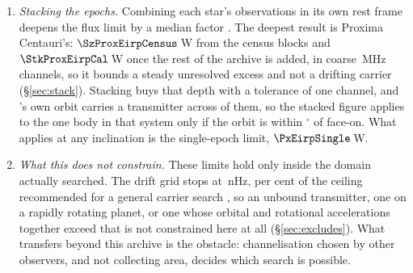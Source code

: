 \begin{enumerate}[leftmargin=1.6em,itemsep=4pt,topsep=4pt,parsep=0pt]
\item \emph{Stacking the epochs.} Combining each star's observations in its
own rest frame deepens the flux limit by a median factor \SyStkGainMed. The
deepest result is Proxima Centauri's: $\SzProxEirpCensus$\,W from the census
blocks and $\StkProxEirpCal$\,W once the rest of the archive is added, in
coarse \ChanBModeMHz\,MHz channels, so it bounds a steady unresolved excess
and not a drifting carrier (\S\ref{sec:stack}). Stacking buys that depth
with a tolerance of one channel, and \PxPlanet's own orbit carries a
transmitter across \PxNChanWalk{} of them, so the stacked figure applies to
the one body in that system only if the orbit is within
\PxIncMaxDeg$^\circ$ of face-on. What applies at any inclination is the
single-epoch limit, $\PxEirpSingle$\,W.

\item \emph{What this does not constrain.} These limits hold only inside the
domain actually searched. The drift grid stops at \DriftCeilLo\,nHz,
\AccelSheikhPct{} per cent of the ceiling recommended for a general carrier
search \citep{Sheikh2019}, so an unbound transmitter, one on a rapidly
rotating planet, or one whose orbital and rotational accelerations together
exceed that is not constrained here at all (\S\ref{sec:excludes}). What
transfers beyond this archive is the obstacle: channelisation chosen by other
observers, and not collecting area, decides which search is possible.

\end{enumerate}
